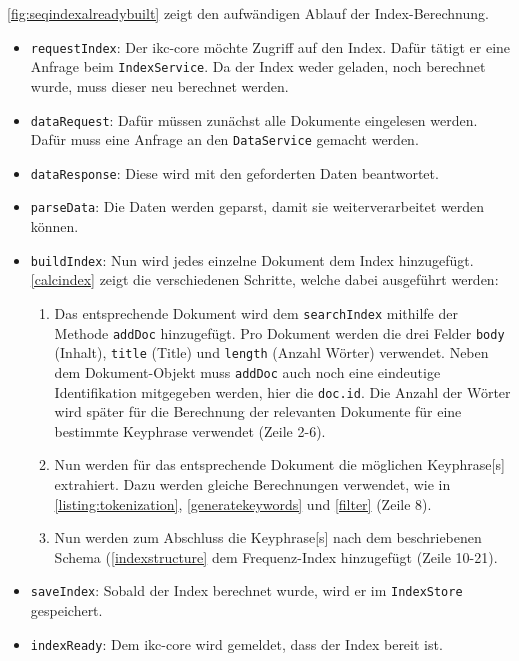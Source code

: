 \autoref{fig:seqindexalreadybuilt} zeigt den aufwändigen Ablauf der Index-Berechnung. 
\begin{itemize}
    \item \texttt{requestIndex}: Der \gls{ikc-core} möchte Zugriff auf den Index. Dafür tätigt er eine Anfrage beim \texttt{IndexService}. Da der Index weder geladen, noch berechnet wurde, muss dieser neu berechnet werden.
    \item \texttt{dataRequest}: Dafür müssen zunächst alle Dokumente eingelesen werden. Dafür muss eine Anfrage an den \texttt{DataService} gemacht werden.
    \item \texttt{dataResponse}: Diese wird mit den geforderten Daten beantwortet.
    \item \texttt{parseData}: Die Daten werden geparst, damit sie weiterverarbeitet werden können.
    \item \texttt{buildIndex}: Nun wird jedes einzelne Dokument dem Index hinzugefügt. \autoref{calcindex} zeigt die verschiedenen Schritte, welche dabei ausgeführt werden:
    \begin{enumerate}
        \item Das entsprechende Dokument wird dem \texttt{searchIndex} mithilfe der Methode \texttt{addDoc} hinzugefügt. Pro Dokument werden die drei Felder \texttt{body} (Inhalt), \texttt{title} (Title) und \texttt{length} (Anzahl Wörter) verwendet. Neben dem Dokument-Objekt muss \texttt{addDoc} auch noch eine eindeutige Identifikation mitgegeben werden, hier die \texttt{doc.id}. Die Anzahl der Wörter wird später für die Berechnung der relevanten Dokumente für eine bestimmte \gls{Keyphrase} verwendet (Zeile 2-6). 
        \item Nun werden für das entsprechende Dokument die mög\-lich\-en \gls{Keyphrase}[s] extrahiert. Dazu werden gleiche Berechnungen verwendet, wie in \autoref{listing:tokenization}, \autoref{generatekeywords} und \autoref{filter} (Zeile 8).
        \item Nun werden zum Abschluss die \gls{Keyphrase}[s] nach dem beschriebenen Schema (\autoref{indexstructure} dem Frequenz-Index hinzugefügt (Zeile 10-21).
    \end{enumerate}
    \item \texttt{saveIndex}: Sobald der Index berechnet wurde, wird er im \texttt{In\-dex\-Store} gespeichert.
    \item \texttt{indexReady}: Dem \gls{ikc-core} wird gemeldet, dass der Index bereit ist.
\end{itemize}

